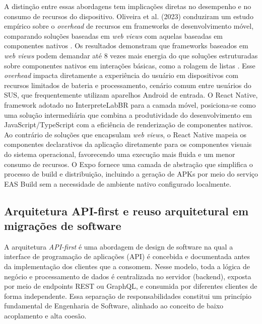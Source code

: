 \documentclass[12pt]{article}
\begin{document}
A distinção entre essas abordagens tem implicações diretas no desempenho e no consumo de recursos do dispositivo. Oliveira et al. (2023) conduziram um estudo empírico sobre o \emph{overhead} de recursos em frameworks de desenvolvimento móvel, comparando soluções baseadas em \emph{web views} com aquelas baseadas em componentes nativos \cite{oliveira2023}. Os resultados demonstram que frameworks baseados em \emph{web views} podem demandar até 8 vezes mais energia do que soluções estruturadas sobre componentes nativos em interações básicas, como a rolagem de listas \cite{oliveira2023}. Esse \emph{overhead} impacta diretamente a experiência do usuário em dispositivos com recursos limitados de bateria e processamento, cenário comum entre usuários do SUS, que frequentemente utilizam aparelhos Android de entrada. O React Native, framework adotado no InterpreteLabBR para a camada móvel, posiciona-se como uma solução intermediária que combina a produtividade do desenvolvimento em JavaScript/TypeScript com a eficiência de renderização de componentes nativos. Ao contrário de soluções que encapsulam \emph{web views}, o React Native mapeia os componentes declarativos da aplicação diretamente para os componentes visuais do sistema operacional, favorecendo uma execução mais fluida e um menor consumo de recursos. O Expo fornece uma camada de abstração que simplifica o processo de build e distribuição, incluindo a geração de APKs por meio do serviço EAS Build sem a necessidade de ambiente nativo configurado localmente.

\subsection{Arquitetura API-first e reuso arquitetural em migrações de software}

A arquitetura \emph{API-first} é uma abordagem de design de software na qual a interface de programação de aplicações (API) é concebida e documentada antes da implementação dos clientes que a consomem. Nesse modelo, toda a lógica de negócio e processamento de dados é centralizada no servidor (backend), exposta por meio de endpoints REST ou GraphQL, e consumida por diferentes clientes de forma independente. Essa separação de responsabilidades constitui um princípio fundamental de Engenharia de Software, alinhado ao conceito de baixo acoplamento e alta coesão.
\end{document}
